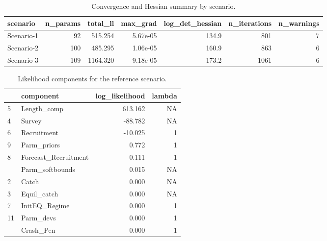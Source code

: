 
\begin{table}

\caption{\label{tab:internal-convergence}Convergence and Hessian summary by scenario.}
\centering
\begin{tabular}[t]{lrrrrrr}
\toprule
scenario & n\_params & total\_ll & max\_grad & log\_det\_hessian & n\_iterations & n\_warnings\\
\midrule
Scenario-1 & 92 & 515.254 & 5.67e-05 & 134.9 & 801 & 7\\
Scenario-2 & 100 & 485.295 & 1.06e-05 & 160.9 & 863 & 6\\
Scenario-3 & 109 & 1164.320 & 9.18e-05 & 173.2 & 1061 & 6\\
\bottomrule
\end{tabular}
\end{table}

\begin{table}

\caption{\label{tab:internal-ll-components}Likelihood components for the reference scenario.}
\centering
\begin{tabular}[t]{llrr}
\toprule
  & component & log\_likelihood & lambda\\
\midrule
5 & Length\_comp & 613.162 & NA\\
4 & Survey & -88.782 & NA\\
6 & Recruitment & -10.025 & 1\\
9 & Parm\_priors & 0.772 & 1\\
8 & Forecast\_Recruitment & 0.111 & 1\\
\addlinespace
10 & Parm\_softbounds & 0.015 & NA\\
2 & Catch & 0.000 & NA\\
3 & Equil\_catch & 0.000 & NA\\
7 & InitEQ\_Regime & 0.000 & 1\\
11 & Parm\_devs & 0.000 & 1\\
\addlinespace
12 & Crash\_Pen & 0.000 & 1\\
\bottomrule
\end{tabular}
\end{table}


